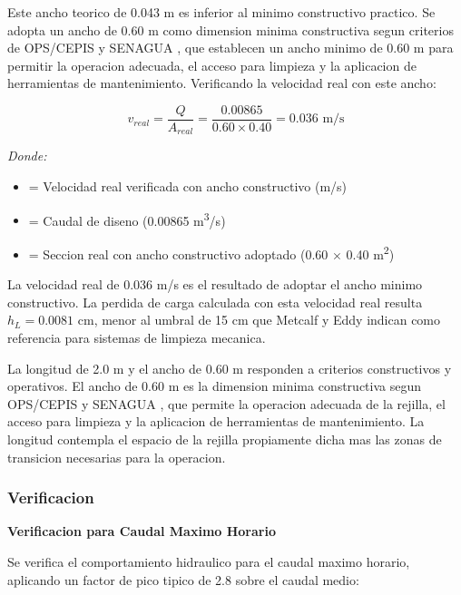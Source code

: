 \documentclass[12pt,a4paper]{article}
\begin{document}
Este ancho teorico de 0.043 m es inferior al minimo constructivo practico. Se adopta un ancho de 0.60 m como dimension minima constructiva segun criterios de OPS/CEPIS \cite{ops2005} y SENAGUA \cite{senagua2012}, que establecen un ancho minimo de 0.60 m para permitir la operacion adecuada, el acceso para limpieza y la aplicacion de herramientas de mantenimiento. Verificando la velocidad real con este ancho:

\begin{equation}
v_{{real}} = \frac{Q}{A_{{real}}} = \frac{0.00865}{0.60 \times 0.40} = 0.036 \text{ m/s}
\end{equation}

\textit{Donde:}
\begin{itemize}[noitemsep,leftmargin=2em]
    \item[$v_{{real}}$] = Velocidad real verificada con ancho constructivo (m/s)
    \item[$Q$] = Caudal de diseno (0.00865 m\textsuperscript{3}/s)
    \item[$A_{{real}}$] = Seccion real con ancho constructivo adoptado (0.60 $\times$ 0.40 m\textsuperscript{2})
\end{itemize}

La velocidad real de 0.036 m/s es el resultado de adoptar el ancho minimo constructivo. La perdida de carga calculada con esta velocidad real resulta $h_L = 0.0081$ cm, menor al umbral de 15 cm que Metcalf y Eddy \cite{metcalf2014} indican como referencia para sistemas de limpieza mecanica.

La longitud de 2.0 m y el ancho de 0.60 m responden a criterios constructivos y operativos. El ancho de 0.60 m es la dimension minima constructiva segun OPS/CEPIS \cite{ops2005} y SENAGUA \cite{senagua2012}, que permite la operacion adecuada de la rejilla, el acceso para limpieza y la aplicacion de herramientas de mantenimiento. La longitud contempla el espacio de la rejilla propiamente dicha mas las zonas de transicion necesarias para la operacion.





\subsubsection{Verificacion}

\textbf{Verificacion para Caudal Maximo Horario}

Se verifica el comportamiento hidraulico para el caudal maximo horario, aplicando un factor de pico tipico de 2.8 sobre el caudal medio:
\end{document}
